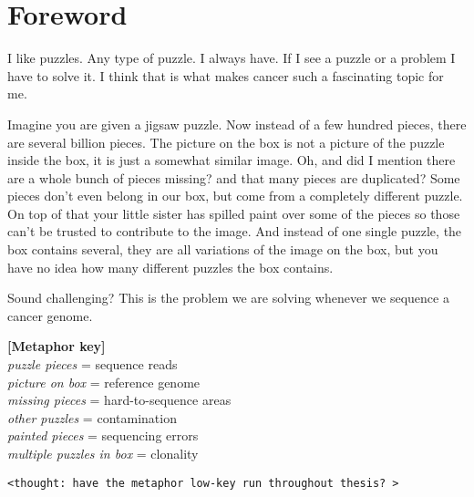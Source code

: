 \chapter*{Foreword}
\setlength\parindent{0pt}
\vspace{-1cm}
I like puzzles. Any type of puzzle. I always have. If I see a puzzle or a problem I have
to solve it. I think that is what makes cancer such a fascinating topic for me.

Imagine you are given a jigsaw puzzle. Now instead of a few hundred pieces, there are
several billion pieces. The picture on the box is not a picture of the puzzle inside the box,
it is just a somewhat similar image. Oh, and did I mention there are a whole bunch
of pieces missing? and that many pieces are duplicated? Some pieces don't even belong in our box,
but come from a completely different puzzle. On top of that your little sister has spilled paint
over some of the pieces so those can't be trusted to contribute to the image. And instead of one
single puzzle, the box contains several, they are all variations of the image on the box, but you have
no idea how many different puzzles the box contains.

Sound challenging? This is the problem we are solving whenever we sequence a cancer genome.

\vspace*{0.5cm}
\textbf{[Metaphor key]} \\
\textit{puzzle pieces} = sequence reads \\
\textit{picture on box} = reference genome \\
\textit{missing pieces} = hard-to-sequence areas \\
\textit{other puzzles} = contamination \\
\textit{painted pieces} = sequencing errors \\
\textit{multiple puzzles in box} = clonality

\verb+<thought: have the metaphor low-key run throughout thesis? >+
